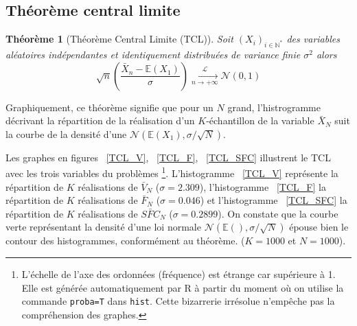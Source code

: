 \documentclass{article}
\newtheorem{theo}{Théorème}
\begin{document}
\subsection{Théorème central limite}
\begin{theo}[Théorème Central Limite (TCL)]Soit \begin{math}(X_{i})_{i\in\mathbb{N}^{*}}\end{math} des variables aléatoires indépendantes et identiquement distribuées de variance finie \begin{math}\sigma^{2}\end{math} alors
\[\sqrt{n}\left(\frac{\bar{X}_{n}-\mathbb{E}(X_{1})}{\sigma}\right)\xrightarrow[\text{$n\to+\infty$}]{\mathcal{L}}\mathcal{N}(0,1)\]
\end{theo}

Graphiquement, ce théorème signifie que pour un $N$ grand, l'histrogramme décrivant la répartition de la réalisation d'un $K$-échantillon de la variable $\bar{X}_{N}$ suit la courbe de la densité d'une $\mathcal{N}(\mathbb{E}(X_1),\sigma/\sqrt{N})$. 

Les graphes en figures ~\ref{TCL_V}, ~\ref{TCL_F}, ~\ref{TCL_SFC}  illustrent le TCL avec les trois variables du problèmes \footnote{L'échelle de l'axe des ordonnées (fréquence) est étrange car supérieure à 1. Elle est générée automatiquement par R à partir du moment où on utilise la commande \texttt{proba=T} dans \texttt{hist}. Cette bizarrerie irrésolue n'empêche pas la compréhension des graphes.}. L'histogramme ~\ref{TCL_V} représente la répartition de $K$ réalisations de $\bar{V}_N$ ($\sigma=2.309$), l'histogramme ~\ref{TCL_F} la répartition de $K$ réalisations de $\bar{F}_N$ ($\sigma=0.046$) et l'histogramme ~\ref{TCL_SFC} la répartition de $K$ réalisations de $\bar{SFC}_N$ ($\sigma=0.2899$). On constate que la courbe verte représentant la densité d'une loi normale $\mathcal{N}(\mathbb{E}(), \sigma/\sqrt{N})$ épouse bien le contour des histogrammes, conformément au théorème. ($K=1000$ et $N=1000$).
\end{document}
